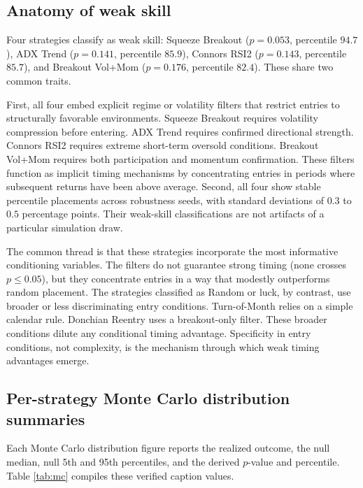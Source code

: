 \documentclass[preprint,12pt]{elsarticle}
\theoremstyle{definition}
\begin{document}
\subsection{Anatomy of weak skill}

Four strategies classify as weak skill: Squeeze Breakout ($p=0.053$, percentile $94.7$), ADX Trend ($p=0.141$, percentile $85.9$), Connors RSI2 ($p=0.143$, percentile $85.7$), and Breakout Vol+Mom ($p=0.176$, percentile $82.4$). These share two common traits.

First, all four embed explicit regime or volatility filters that restrict entries to structurally favorable environments. Squeeze Breakout requires volatility compression before entering. ADX Trend requires confirmed directional strength. Connors RSI2 requires extreme short-term oversold conditions. Breakout Vol+Mom requires both participation and momentum confirmation. These filters function as implicit timing mechanisms by concentrating entries in periods where subsequent returns have been above average. Second, all four show stable percentile placements across robustness seeds, with standard deviations of $0.3$ to $0.5$ percentage points. Their weak-skill classifications are not artifacts of a particular simulation draw.

The common thread is that these strategies incorporate the most informative conditioning variables. The filters do not guarantee strong timing (none crosses $p \le 0.05$), but they concentrate entries in a way that modestly outperforms random placement. The strategies classified as Random or luck, by contrast, use broader or less discriminating entry conditions. Turn-of-Month relies on a simple calendar rule. Donchian Reentry uses a breakout-only filter. These broader conditions dilute any conditional timing advantage. Specificity in entry conditions, not complexity, is the mechanism through which weak timing advantages emerge.

\subsection{Per-strategy Monte Carlo distribution summaries}

Each Monte Carlo distribution figure reports the realized outcome, the null median, null 5th and 95th percentiles, and the derived $p$-value and percentile. Table \ref{tab:mc} compiles these verified caption values.
\end{document}
